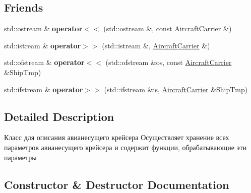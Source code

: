 \subsection*{Friends}
\begin{DoxyCompactItemize}
\item 
\mbox{\label{class_aircraft_carrier_group_1_1_aircraft_carrier_aceadecaaab410111d76743b193972651}} 
std\+::ostream \& {\bfseries operator$<$$<$} (std\+::ostream \&, const \mbox{\hyperlink{class_aircraft_carrier_group_1_1_aircraft_carrier}{Aircraft\+Carrier}} \&)
\item 
\mbox{\label{class_aircraft_carrier_group_1_1_aircraft_carrier_a9a3a3c478af09b6941e89c0fefcb73b9}} 
std\+::istream \& {\bfseries operator$>$$>$} (std\+::istream \&, \mbox{\hyperlink{class_aircraft_carrier_group_1_1_aircraft_carrier}{Aircraft\+Carrier}} \&)
\item 
\mbox{\label{class_aircraft_carrier_group_1_1_aircraft_carrier_adb7d0edf5f6031c0fcee267e02f38528}} 
std\+::ofstream \& {\bfseries operator$<$$<$} (std\+::ofstream \&os, const \mbox{\hyperlink{class_aircraft_carrier_group_1_1_aircraft_carrier}{Aircraft\+Carrier}} \&Ship\+Tmp)
\item 
\mbox{\label{class_aircraft_carrier_group_1_1_aircraft_carrier_a45f3e10b1bd4a3af9457a15d034e60ad}} 
std\+::ifstream \& {\bfseries operator$>$$>$} (std\+::ifstream \&is, \mbox{\hyperlink{class_aircraft_carrier_group_1_1_aircraft_carrier}{Aircraft\+Carrier}} \&Ship\+Tmp)
\end{DoxyCompactItemize}


\subsection{Detailed Description}
Класс для описания авианесущего крейсера  Осуществляет хранение всех параметров авианесущего крейсера и содержит функции, обрабатывающие эти параметры 

\subsection{Constructor \& Destructor Documentation}
\mbox{\label{class_aircraft_carrier_group_1_1_aircraft_carrier_a612d60f0e6c3b14158ab3b6efb63c7d5}} 
